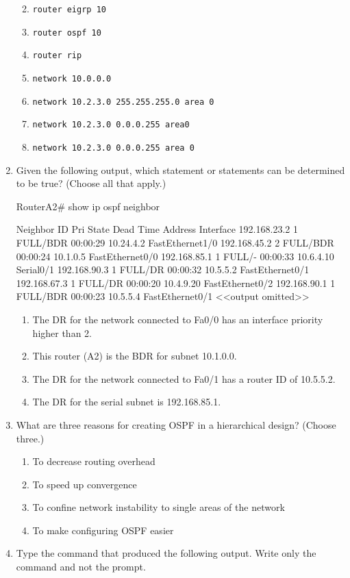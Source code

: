 \begin{enumerate}
  \begin{enumerate}
  \def\labelenumii{\Alph{enumii}.}
    \item
    \texttt{router\ eigrp\ 10}
  \item
    \texttt{router\ ospf\ 10}
  \item
    \texttt{router\ rip}
  \item
    \texttt{network\ 10.0.0.0}
  \item
    \texttt{network\ 10.2.3.0\ 255.255.255.0\ area\ 0}
  \item
    \texttt{network\ 10.2.3.0\ 0.0.0.255\ area0}
  \item
    \texttt{network\ 10.2.3.0\ 0.0.0.255\ area\ 0}
  \end{enumerate}
\item
  Given the following output, which statement or statements can be
  determined to be true? (Choose all that apply.)

\begin{cli}
RouterA2# show ip ospf neighbor

Neighbor ID Pri State Dead Time Address Interface
192.168.23.2 1 FULL/BDR 00:00:29 10.24.4.2 FastEthernet1/0
192.168.45.2 2 FULL/BDR 00:00:24 10.1.0.5 FastEthernet0/0
192.168.85.1 1 FULL/- 00:00:33 10.6.4.10 Serial0/1
192.168.90.3 1 FULL/DR 00:00:32 10.5.5.2 FastEthernet0/1
192.168.67.3 1 FULL/DR 00:00:20 10.4.9.20 FastEthernet0/2
192.168.90.1 1 FULL/BDR 00:00:23 10.5.5.4 FastEthernet0/1
<<output omitted>>
\end{cli}

  \begin{enumerate}
  \def\labelenumii{\Alph{enumii}.}
    \item
    The DR for the network connected to Fa0/0 has an interface priority
    higher than 2.
  \item
    This router (A2) is the BDR for subnet 10.1.0.0.
  \item
    The DR for the network connected to Fa0/1 has a router ID of
    10.5.5.2.
  \item
    The DR for the serial subnet is 192.168.85.1.
  \end{enumerate}
\item
  What are three reasons for creating OSPF in a hierarchical design?
  (Choose three.)

  \begin{enumerate}
  \def\labelenumii{\Alph{enumii}.}
    \item
    To decrease routing overhead
  \item
    To speed up convergence
  \item
    To confine network instability to single areas of the network
  \item
    To make configuring OSPF easier
  \end{enumerate}
\item
  Type the command that produced the following output. Write only the
  command and not the prompt.


\end{enumerate}
